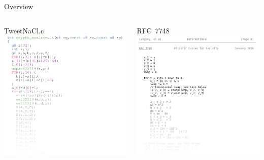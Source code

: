 \documentclass[8pt,aspectratio=169]{beamer}
\begin{document}
\begin{frame}{Overview}
	\begin{columns}
		\begin{column}[T]{0.3\textwidth}
			\vspace{0pt}%
			\centering
			\large{TweetNaCl.c}\\
			\vspace{0.2cm}
			\includegraphics[width=\textwidth]{MontgomeryG.png}
		\end{column}
		\begin{column}[T]{0.3\textwidth}
			\vspace{0pt}%
			\centering
			\large{RFC~7748}\\
			\vspace{0.2cm}
			\includegraphics[width=\textwidth]{rfcG.png}

\end{column}
\end{columns}
\end{frame}
\end{document}
